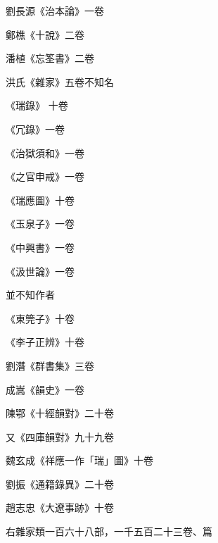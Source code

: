 \begin{pinyinscope}
 劉長源《治本論》一卷



 鄭樵《十說》二卷



 潘植《忘筌書》二卷



 洪氏《雜家》五卷不知名



 《瑞錄》
 十卷



 《冗錄》一卷



 《治獄須和》一卷



 《之官申戒》一卷



 《瑞應圖》十卷



 《玉泉子》一卷



 《中興書》一卷



 《汲世論》一卷



 並不知作者



 《東筦子》十卷



 《李子正辨》十卷



 劉潛《群書集》三卷



 成嵩《韻史》一卷



 陳鄂《十經韻對》二十卷



 又《四庫韻對》九十九卷



 魏玄成《祥應一作「瑞」圖》十卷



 劉振《通籍錄異》二十卷



 趙志忠《大遼事跡》十卷



 右雜家類一百六十八部，一千五百二十三卷、篇



\end{pinyinscope}